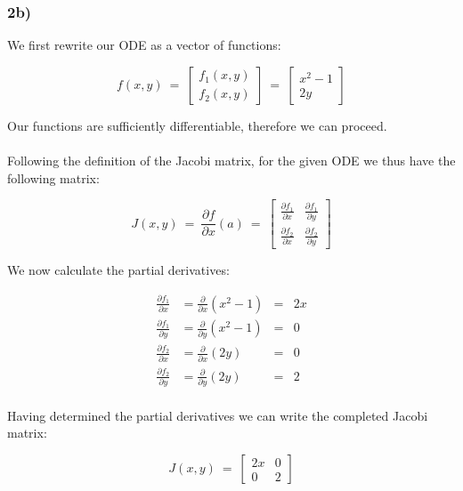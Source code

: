 \documentclass[]{scrartcl}
\begin{document}

\subsubsection*{2b)}

We first rewrite our ODE as a vector of functions:

\[
f(x,y) ~=~ \left[ \begin{array}{c} f_1(x,y) \\ f_2(x,y) \end{array} \right] ~=~ \left[ \begin{array}{c} x^2 - 1 \\ 2y \end{array} \right]
\]

Our functions are sufficiently differentiable, therefore we can proceed.
\\ \\
Following the definition of the Jacobi matrix, for the given ODE we thus have the following matrix:

\[
J(x,y) ~=~ \frac{\partial f}{\partial x}(a) ~=~
\begin{bmatrix}
  \frac{\partial f_1}{\partial x} & \frac{\partial f_1}{\partial y} \\[1ex] %
  \frac{\partial f_2}{\partial x} & \frac{\partial f_2}{\partial y}
\end{bmatrix}
\]

We now calculate the partial derivatives:

\begin{center}
\begin{align*}
	\frac{\partial f_1}{\partial x} &= \frac{\partial}{\partial x}(x^2 - 1) &= & 2x \\
	\frac{\partial f_1}{\partial y} &= \frac{\partial}{\partial y}(x^2 - 1) &= & 0 \\
	\frac{\partial f_2}{\partial x} &= \frac{\partial}{\partial x}(2y)	&= & 0 \\
	\frac{\partial f_2}{\partial y} &= \frac{\partial}{\partial y}(2y)	&= & 2 \\
\end{align*}
\end{center}

Having determined the partial derivatives we can write the completed Jacobi matrix:

\[
J(x,y) ~=~
\begin{bmatrix}
  2x & 0 \\[1ex] %
  0 & 2
\end{bmatrix}
\]
\end{document}
